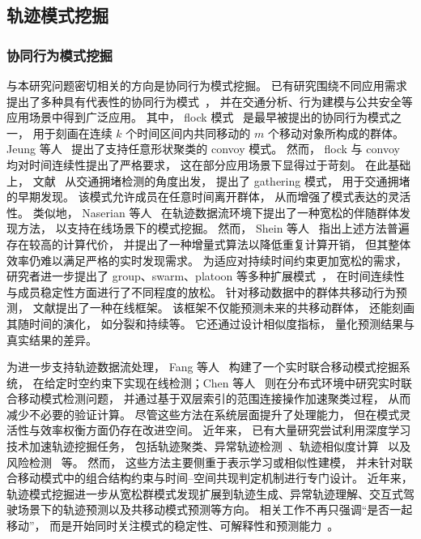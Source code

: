 \subsection{轨迹模式挖掘}
\subsubsection*{协同行为模式挖掘}
与本研究问题密切相关的方向是协同行为模式挖掘。 已有研究围绕不同应用需求提出了多种具有代表性的协同行为模式~， 并在交通分析、行为建模与公共安全等应用场景中得到广泛应用。 其中， flock 模式~ 是最早被提出的协同行为模式之一， 用于刻画在连续 $k$ 个时间区间内共同移动的 $m$ 个移动对象所构成的群体。 Jeung 等人~ 提出了支持任意形状聚类的 convoy 模式。 然而， flock 与 convoy 均对时间连续性提出了严格要求， 这在部分应用场景下显得过于苛刻。 在此基础上， 文献~ 从交通拥堵检测的角度出发， 提出了 gathering 模式， 用于交通拥堵的早期发现。 该模式允许成员在任意时间离开群体， 从而增强了模式表达的灵活性。 类似地， Naserian 等人~ 在轨迹数据流环境下提出了一种宽松的伴随群体发现方法， 以支持在线场景下的模式挖掘。 然而， Shein 等人~ 指出上述方法普遍存在较高的计算代价， 并提出了一种增量式算法以降低重复计算开销， 但其整体效率仍难以满足严格的实时发现需求。 为适应对持续时间约束更加宽松的需求， 研究者进一步提出了 group、swarm、platoon 等多种扩展模式~， 在时间连续性与成员稳定性方面进行了不同程度的放松。 针对移动数据中的群体共移动行为预测， 文献提出了一种在线框架。 该框架不仅能预测未来的共移动群体， 还能刻画其随时间的演化， 如分裂和持续等。 它还通过设计相似度指标， 量化预测结果与真实结果的差异。


为进一步支持轨迹数据流处理， Fang 等人~ 构建了一个实时联合移动模式挖掘系统， 在给定时空约束下实现在线检测；Chen 等人~ 则在分布式环境中研究实时联合移动模式检测问题， 并通过基于双层索引的范围连接操作加速聚类过程， 从而减少不必要的验证计算。 尽管这些方法在系统层面提升了处理能力， 但在模式灵活性与效率权衡方面仍存在改进空间。 近年来， 已有大量研究尝试利用深度学习技术加速轨迹挖掘任务， 包括轨迹聚类、异常轨迹检测~、轨迹相似度计算~ 以及风险检测~ 等。 然而， 这些方法主要侧重于表示学习或相似性建模， 并未针对联合移动模式中的组合结构约束与时间–空间共现判定机制进行专门设计。 近年来， 轨迹模式挖掘进一步从宽松群模式发现扩展到轨迹生成、异常轨迹理解、交互式驾驶场景下的轨迹预测以及共移动模式预测等方向。 相关工作不再只强调“是否一起移动”， 而是开始同时关注模式的稳定性、可解释性和预测能力~。


